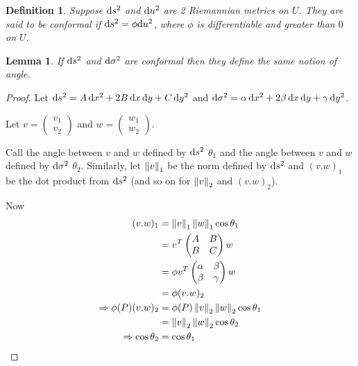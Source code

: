 \documentclass{notes}
\theoremstyle{plain}
\newtheorem{definition}[proposition]{Definition}
\newtheorem{lemma}[proposition]{Lemma}
\begin{document}
\begin{definition}
  Suppose $\mathrm{d} s^2$ and $\mathrm{d} u^2$ are 2 Riemannian metrics on $U$.
  They are said to be \emph{conformal} if $\mathrm{d} s^2 = \phi \mathrm{d} u^2$,
  where $\phi$ is differentiable and greater than $0$ on $U$.
\end{definition}

\begin{lemma}
  If $\mathrm{d} s^2$ and $\mathrm{d}\sigma^2$ are conformal then they define the
  same notion of angle.
\end{lemma}

\begin{proof}
  Let $\mathrm{d} s^2 = A\, \mathrm{d} x^2 + 2 B\, \mathrm{d} x\, \mathrm{d} y + C\, \mathrm{d} y^2$ and
  $\mathrm{d}\sigma^2 = \alpha\, \mathrm{d} x^2 + 2 \beta\, \mathrm{d} x\, \mathrm{d} y + \gamma\,
  \mathrm{d} y^2$.

Let $v = \left(\begin{matrix}v_1 \\ v_2 \end{matrix} \right)$ and
$w = \left(\begin{matrix}w_1 \\ w_2 \end{matrix} \right)$.

Call the angle between $v$ and $w$ defined by $\mathrm{d} s^2$ $\theta_1$ and
the angle between $v$ and $w$ defined by $\mathrm{d}\sigma^2$ $\theta_2$.
Similarly, let $\left\|v\right\|_1$ be the norm defined by $\mathrm{d} s^2$ and
$(v.w)_1$ be the dot product from $\mathrm{d} s^2$ (and so on for
$\left\|v\right\|_2$ and $(v.w)_2$).

Now
\begin{align*}
(v.w)_1 &= \left\|v\right\|_1 \left\|w\right\|_1 \cos \theta_1 \\
&= v^T \left( \begin{matrix}A & B \\ B & C \end{matrix} \right) w \\
&= \phi v^T \left( \begin{matrix}\alpha & \beta \\ \beta & \gamma \end{matrix}
\right) w \\
&= \phi (v.w)_2 \\
\Rightarrow \phi(P) (v.w)_2 &= \phi(P) \left\|v\right\|_2 \left\|w\right\|_2 \cos \theta_1 \\
&=\left\|v\right\|_2 \left\|w\right\|_2 \cos \theta_2 \\
\Rightarrow \cos \theta_2 &= \cos \theta_1
\end{align*}
\end{proof}
\end{document}
